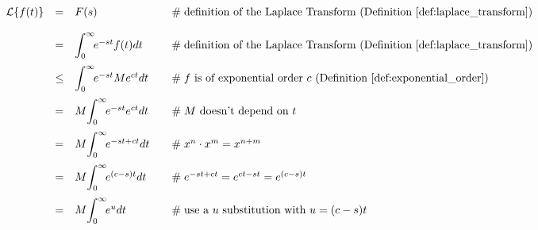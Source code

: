 \documentclass{article}
\theoremstyle{definition}
\begin{document}
\begin{equation*}
\begin{array}{lllll}
\mathcal{L}\{f(t)\}
&=& F(s)                                                                            &\quad  \mathrel{\#} \text{definition of the Laplace Transform (Definition \ref{def:laplace_transform})}                                                              \\  
[12pt]                                                                                 %
&=&   \mathlarger{\int}_0^\infty \! e^{-st} f(t) dt                  &\quad  \mathrel{\#} \text{definition of the Laplace Transform (Definition \ref{def:laplace_transform})}                                                              \\  
[12pt]                                                                                 %
&\leq& \mathlarger{\int}_0^\infty \! e^{-st}  Me^{ct}dt         &\quad  \mathrel{\#} \text{$f$ is of exponential order $c$ (Definition \ref{def:exponential_order})}                                                                     \\  
[12pt]                                                                                 %
&=& M \mathlarger{\int}_0^\infty \! e^{-st} e^{ct} dt           &\quad  \mathrel{\#} \text{$M$ doesn't depend on $t$}                                                                                                                                        \\   
[12pt]                                                                                %
&=& M \mathlarger{\int}_0^\infty \! e^{-st + ct}  dt             &\quad  \mathrel{\#} \text{$x^n \cdot x^m = x^{n+m}$}                                                                                                                                         \\      
[12pt]                                                                                 %
&=& M \mathlarger{\int}_0^\infty\! e^{(c-s)t}  dt                 &\quad  \mathrel{\#}  e^{-st + ct} = e^{ct -st} = e^{(c-s)t}                                                                                                                                      \\      
[12pt]                                                                                 %
&=&  M \mathlarger{\int}_0^\infty \! e^u dt                         &\quad  \mathrel{\#} \text{use a $u$ substitution with $u = (c-s)t$}                                                                                                                     \\     

\end{array}
\end{equation*}
\end{document}
